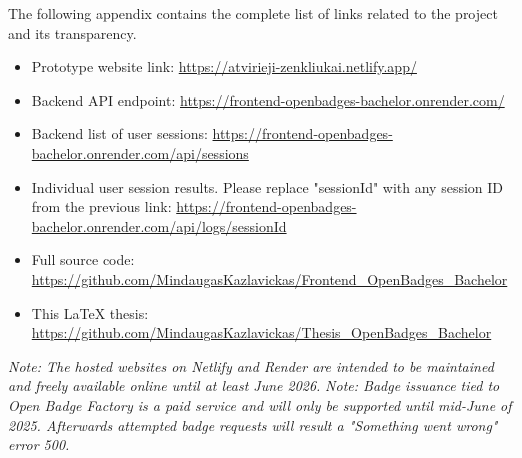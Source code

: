 \newpage
{}
\label{appendix:external_resources}

The following appendix contains the complete list of links related to the project and its transparency.

\vspace{0.5em}
\begin{itemize}
  \item Prototype website link: \url{https://atvirieji-zenkliukai.netlify.app/}
  \item Backend API endpoint: \url{https://frontend-openbadges-bachelor.onrender.com/}
  \item Backend list of user sessions: \url{https://frontend-openbadges-bachelor.onrender.com/api/sessions}
  \item Individual user session results. Please replace "sessionId" with any session ID from the previous link: \url{https://frontend-openbadges-bachelor.onrender.com/api/logs/sessionId}
  \item Full source code: \url{https://github.com/MindaugasKazlavickas/Frontend_OpenBadges_Bachelor}
  \item This LaTeX thesis: \url{https://github.com/MindaugasKazlavickas/Thesis_OpenBadges_Bachelor}
\end{itemize}

\textit{Note: The hosted websites on Netlify and Render are intended to be maintained and freely available online until at least June 2026.}
\textit{Note: Badge issuance tied to Open Badge Factory is a paid service and will only be supported until mid-June of 2025. Afterwards attempted badge requests will result a "Something went wrong" error 500.}